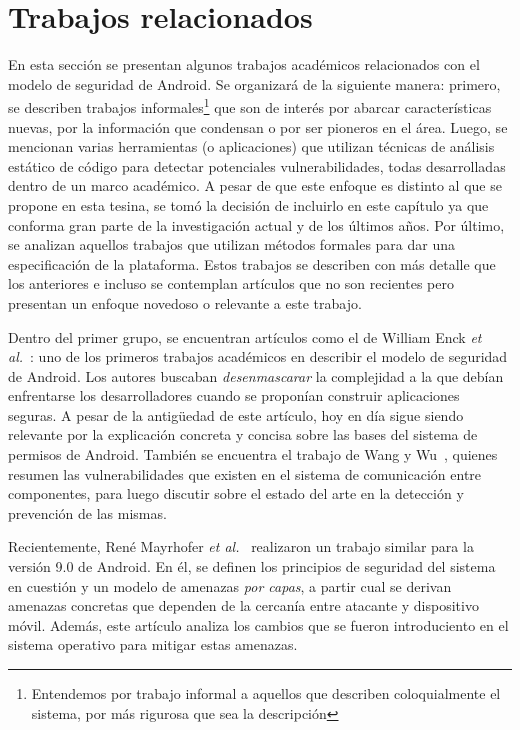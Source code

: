 
\chapter{Trabajos relacionados}
\label{chapter:estado}

En esta sección se presentan algunos trabajos académicos relacionados con el
modelo de seguridad de Android. Se organizará de la siguiente manera: primero,
se describen trabajos informales\footnote{Entendemos por trabajo informal a
    aquellos que describen coloquialmente el sistema, por más rigurosa que sea la
    descripción} que son de interés por abarcar características nuevas, por la
información que condensan o por ser pioneros en el área. Luego, se mencionan
varias herramientas (o aplicaciones) que utilizan técnicas de análisis estático
de código para detectar potenciales vulnerabilidades, todas desarrolladas dentro
de un marco académico. A pesar de que este enfoque  es distinto al que se
propone en esta tesina, se tomó la decisión de incluirlo en este capítulo ya que
conforma gran parte de la investigación actual y de los últimos años. Por
último, se analizan aquellos trabajos que utilizan métodos formales para dar una
especificación de la plataforma. Estos trabajos se describen con más detalle que
los anteriores e incluso se contemplan artículos que no son recientes pero
presentan un enfoque novedoso o relevante a este trabajo.

Dentro del primer grupo, se encuentran artículos como el de William Enck
\textit{et al.}~\cite{enck}: uno de los primeros trabajos académicos en
describir el modelo de seguridad de Android. Los autores buscaban
\textit{desenmascarar} la complejidad a la que debían enfrentarse los
desarrolladores cuando se proponían construir aplicaciones seguras. A pesar de
la antigüedad de este artículo, hoy en día sigue siendo relevante por la
explicación concreta y concisa sobre las bases del sistema de permisos de
Android. También se encuentra el trabajo de Wang y Wu~\cite{wang}, quienes
resumen las vulnerabilidades que existen en el sistema de comunicación entre
componentes, para luego discutir sobre el estado del arte en la detección y
prevención de las mismas.

Recientemente, René Mayrhofer \textit{et al.}~\cite{mayrhofer} realizaron un
trabajo similar para la versión 9.0 de Android. En él, se definen los principios
de seguridad del sistema en cuestión y un modelo de amenazas \textit{por capas},
a partir cual se derivan amenazas concretas que dependen de la cercanía entre
atacante y dispositivo móvil. Además, este artículo analiza los cambios que se
fueron introduciento en el sistema operativo para mitigar estas amenazas.

